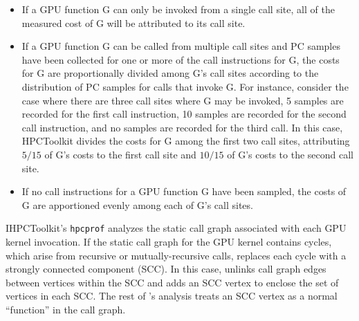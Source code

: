 \begin{itemize}
\item
If a GPU function G can only be invoked from a single call site, all of the measured cost of G will be attributed to its call site. 
\item
If a GPU function G can be called from multiple call sites and PC samples have been collected for one or more of the call instructions for G, the costs for G are proportionally divided among G's call sites according to the distribution of PC samples for calls that invoke G.  For instance, consider the case where there are three call sites where G may be invoked, 5 samples are recorded for the first call instruction, 10 samples are recorded for the second call instruction, and no samples are recorded for the third call. In this case, HPCToolkit divides the costs for G  among the first two call sites, attributing $5/15$ of G's costs  to the first call site and $10/15$ of G's costs to the second call site. 
\item
If no call instructions for a GPU function G have been sampled, the costs of G are apportioned evenly among each of G's call sites.
\end{itemize}

IHPCToolkit's {\tt hpcprof} analyzes the static call graph associated with each GPU kernel invocation. If the static call graph for the GPU kernel contains cycles, which arise from recursive or mutually-recursive calls,  \hpcprof{} replaces each cycle with a strongly connected component (SCC). In this case, \hpcprof{} unlinks call graph edges between vertices within the SCC and adds an SCC vertex to enclose the set of vertices in each SCC. The rest of \hpcprof{}'s analysis 
treats an SCC vertex as a normal ``function'' in the call graph.

